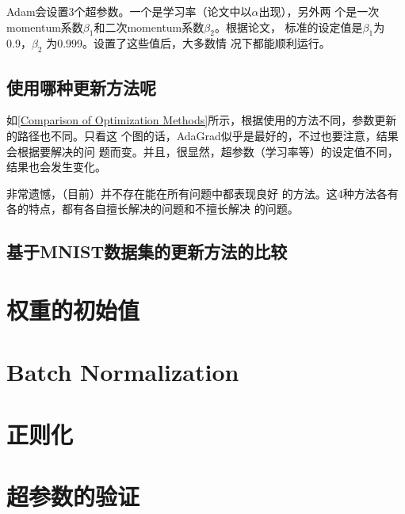 \begin{tcolorbox}
    Adam会设置3个超参数。一个是学习率（论文中以$\alpha$出现），另外两
    个是一次momentum系数$\beta_1$和二次momentum系数$\beta_2$。根据论文，
    标准的设定值是$\beta_1$为0.9，$\beta_2$ 为0.999。设置了这些值后，大多数情
    况下都能顺利运行。
\end{tcolorbox}
\subsection{使用哪种更新方法呢}

如\autoref{Comparison of Optimization Methods}所示，根据使用的方法不同，参数更新的路径也不同。只看这
个图的话，AdaGrad似乎是最好的，不过也要注意，结果会根据要解决的问
题而变。并且，很显然，超参数（学习率等）的设定值不同，结果也会发生变化。

非常遗憾，（目前）并不存在能在所有问题中都表现良好
的方法。这4种方法各有各的特点，都有各自擅长解决的问题和不擅长解决
的问题。

\subsection{基于MNIST数据集的更新方法的比较}
\section{权重的初始值}
\section{Batch Normalization}
\section{正则化}
\section{超参数的验证}